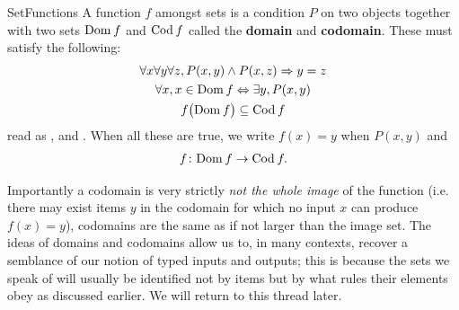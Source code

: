 \documentclass[11pt]{article}
\begin{document}
\begin{label definition}{SetFunctions}
A function $f$ amongst sets is a condition $P$ on two objects together with two sets $\text{Dom} \hspace{0.2em} f$ and $\text{Cod} \hspace{0.2em} f$ called the \textbf{domain} and \textbf{codomain}. These must satisfy the following: \begin{gather*}
\forall x\forall y \forall z, P(x,y) \wedge P(x,z) \Rightarrow y = z \\
\forall x, x \in \text{Dom} \hspace{0.2em} f \Leftrightarrow \exists y, P(x,y)\\
f\big(\text{Dom} \hspace{0.2em} f\big) \subseteq \text{Cod} \hspace{0.2em} f
\end{gather*}
read as ,  and . When all these are true, we write $f(x) = y$ when $P(x,y)$ and \begin{gather*}
f \colon \text{Dom} \hspace{0.2em} f \to \text{Cod} \hspace{0.2em} f.
\end{gather*}

\end{label definition}

Importantly a codomain is very strictly \emph{not the whole image} of the function (i.e. there may exist items $y$ in the codomain for which no input $x$ can produce $f(x)=y$), codomains are the same as if not larger than the image set. The ideas of domains and codomains allow us to, in many contexts, recover a semblance of our notion of typed inputs and outputs; this is because the sets we speak of will usually be identified not by items but by what rules their elements obey as discussed earlier. We will return to this thread later.
\end{document}
